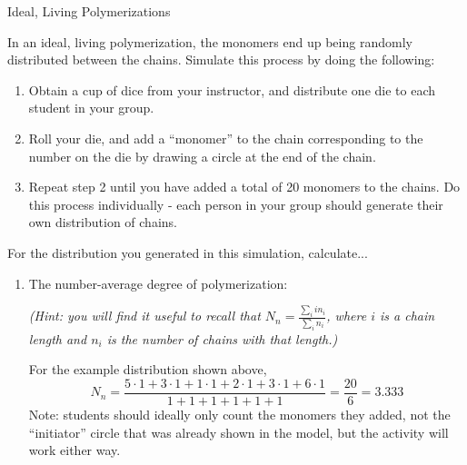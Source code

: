 \begin{activity}{Ideal, Living Polymerizations}
\begin{model}
		In an ideal, living polymerization, the monomers end up being randomly distributed between the chains.  Simulate this process by doing the following:
		\begin{enumerate}
			\item Obtain a cup of dice from your instructor, and distribute one die to each student in your group.
			\item Roll your die, and add a ``monomer'' to the chain corresponding to the number on the die by drawing a circle at the end of the chain.
			\item Repeat step 2 until you have added a total of 20 monomers to the chains.  Do this process individually - each person in your group should generate their own distribution of chains.
		\end{enumerate}
		
		\vspace{-18pt}
		\begin{solution}\end{solution} %
	
\end{model}

\begin{ctqs}
	
	\question For the distribution you generated in this simulation, calculate... \label{\labelbase:ctq:simulationcalcs}
	
		\begin{enumerate}
			\item The number-average degree of polymerization:
			
				\emph{(Hint: you will find it useful to recall that $N_n = \frac{\sum_i i n_i}{\sum_i n_i}$, where $i$ is a chain length and $n_i$ is the number of chains with that length.)}
			
				\begin{solution}[2in]
					For the example distribution shown above,
					\begin{equation*}
						N_n = \frac{5\cdot 1 + 3\cdot 1 + 1\cdot 1 + 2\cdot 1 + 3\cdot 1 + 6\cdot 1}{1+1+1+1+1+1} = \frac{20}{6}=3.333
					\end{equation*}
					Note: students should ideally only count the monomers they added, not the ``initiator'' circle that was already shown in the model, but the activity will work either way.
				\end{solution}
			

\end{enumerate}
\end{ctqs}
\end{activity}
